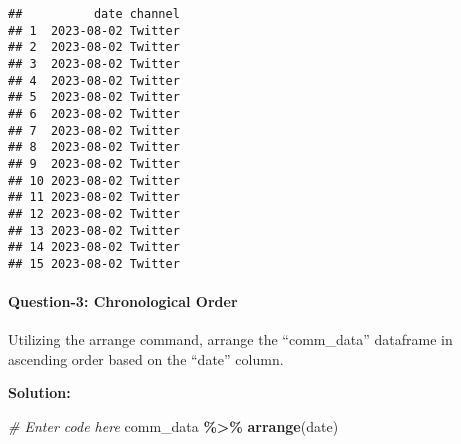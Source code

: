 \documentclass[
]{article}
\newenvironment{Shaded}{\begin{snugshade}}{\end{snugshade}}
\newcommand{\CommentTok}[1]{\textcolor[rgb]{0.56,0.35,0.01}{\textit{#1}}}
\newcommand{\FunctionTok}[1]{\textcolor[rgb]{0.13,0.29,0.53}{\textbf{#1}}}
\newcommand{\NormalTok}[1]{#1}
\newcommand{\SpecialCharTok}[1]{\textcolor[rgb]{0.81,0.36,0.00}{\textbf{#1}}}
\begin{document}
\begin{verbatim}
##          date channel
## 1  2023-08-02 Twitter
## 2  2023-08-02 Twitter
## 3  2023-08-02 Twitter
## 4  2023-08-02 Twitter
## 5  2023-08-02 Twitter
## 6  2023-08-02 Twitter
## 7  2023-08-02 Twitter
## 8  2023-08-02 Twitter
## 9  2023-08-02 Twitter
## 10 2023-08-02 Twitter
## 11 2023-08-02 Twitter
## 12 2023-08-02 Twitter
## 13 2023-08-02 Twitter
## 14 2023-08-02 Twitter
## 15 2023-08-02 Twitter
\end{verbatim}

\hypertarget{question-3-chronological-order}{%
\paragraph{Question-3: Chronological
Order}\label{question-3-chronological-order}}

Utilizing the arrange command, arrange the ``comm\_data'' dataframe in
ascending order based on the ``date'' column.

\textbf{Solution:}

\begin{Shaded}
\begin{Highlighting}[]
\CommentTok{\# Enter code here}
\NormalTok{comm\_data }\SpecialCharTok{\%\textgreater{}\%} \FunctionTok{arrange}\NormalTok{(date)}
\end{Highlighting}
\end{Shaded}
\end{document}

